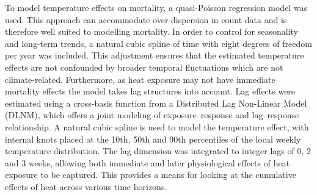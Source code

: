 \documentclass[
]{krantz}
\begin{document}
To model temperature effects on mortality, a quasi-Poisson regression model was used. This approach can accommodate over-dispersion in count data and is therefore well suited to modelling mortality. In order to control for seasonality and long-term trends, a natural cubic spline of time with eight degrees of freedom per year was included. This adjustment ensures that the estimated temperature effects are not confounded by broader temporal fluctuations which are not climate-related. Furthermore, as heat exposure may not have immediate mortality effects the model takes lag structures into account. Lag effects were estimated using a cross-basis function from a Distributed Lag Non-Linear Model (DLNM), which offers a joint modeling of exposure--response and lag--response relationship. A natural cubic spline is used to model the temperature effect, with internal knots placed at the 10th, 50th and 90th percentiles of the local weekly temperature distribution. The lag dimension was integrated to integer lags of 0, 2 and 3 weeks, allowing both immediate and later physiological effects of heat exposure to be captured. This provides a means for looking at the cumulative effects of heat across various time horizons.
\end{document}
